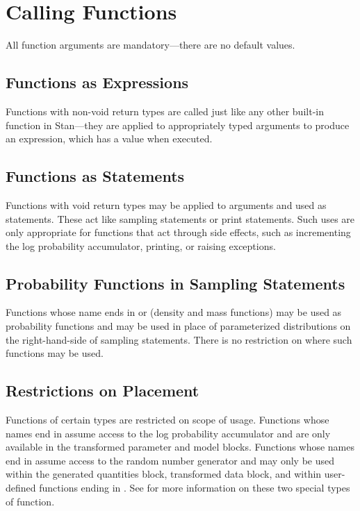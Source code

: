 \section{Calling Functions}

All function arguments are mandatory---there are no default values.

\subsection{Functions as Expressions}

Functions with non-void return types are called just like any other
built-in function in Stan---they are applied to appropriately typed
arguments to produce an expression, which has a value when executed.

\subsection{Functions as Statements}

Functions with void return types may be applied to arguments and used
as statements.  These act like sampling statements or print
statements.  Such uses are only appropriate for functions that act
through side effects, such as incrementing the log probability
accumulator, printing, or raising exceptions.

\subsection{Probability Functions in Sampling Statements}

Functions whose name ends in  or  (density
and mass functions) may be used as probability functions and may be
used in place of parameterized distributions on the right-hand-side of
sampling statements.  There is no restriction on where such functions
may be used.

\subsection{Restrictions on Placement}

Functions of certain types are restricted on scope of usage.
Functions whose names end in  assume access to the log
probability accumulator and are only available in the transformed
parameter and model blocks.  Functions whose names end in 
assume access to the random number generator and may only be used
within the generated quantities block, transformed data block, and
within user-defined functions ending in .  See
 for more information on these two special
types of function.

